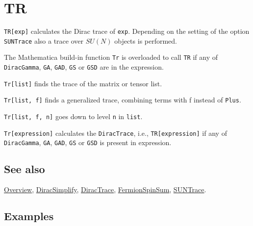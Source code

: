 \documentclass[../FeynCalcManual.tex]{subfiles}
\begin{document}
\hypertarget{tr}{
\section{TR}\label{tr}}

\texttt{TR[\allowbreak{}exp]} calculates the Dirac trace of
\texttt{exp}. Depending on the setting of the option \texttt{SUNTrace}
also a trace over \(SU(N)\) objects is performed.

The Mathematica build-in function \texttt{Tr} is overloaded to call
\texttt{TR} if any of \texttt{DiracGamma}, \texttt{GA}, \texttt{GAD},
\texttt{GS} or \texttt{GSD} are in the expression.

\texttt{Tr[\allowbreak{}list]} finds the trace of the matrix or tensor
list.

\texttt{Tr[\allowbreak{}list,\ \allowbreak{}f]} finds a generalized
trace, combining terms with f instead of \texttt{Plus}.

\texttt{Tr[\allowbreak{}list,\ \allowbreak{}f,\ \allowbreak{}n]} goes
down to level \texttt{n} in \texttt{list}.

\texttt{Tr[\allowbreak{}expression]} calculates the \texttt{DiracTrace},
i.e., \texttt{TR[\allowbreak{}expression]} if any of
\texttt{DiracGamma}, \texttt{GA}, \texttt{GAD}, \texttt{GS} or
\texttt{GSD} is present in expression.

\subsection{See also}

\hyperlink{toc}{Overview}, \hyperlink{diracsimplify}{DiracSimplify},
\hyperlink{diractrace}{DiracTrace},
\hyperlink{fermionspinsum}{FermionSpinSum},
\hyperlink{suntrace}{SUNTrace}.

\subsection{Examples}

\begin{Shaded}
\begin{Highlighting}[]
\OperatorTok{[}\SpecialCharTok{\textbackslash{}}\OperatorTok{[}\OperatorTok{],} \SpecialCharTok{\textbackslash{}}\OperatorTok{[}\OperatorTok{]]} 
 
\OperatorTok{[}\SpecialCharTok{\%}\OperatorTok{]}
\end{Highlighting}
\end{Shaded}
\end{document}
